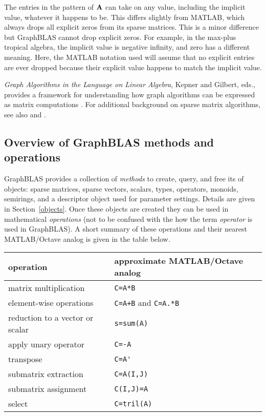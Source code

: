 \documentclass[12pt]{article}
\begin{document}
The entries in the pattern of ${\bf A}$ can take on any value, including the
implicit value, whatever it happens to be.  This differs slightly from MATLAB,
which always drops all explicit zeros from its sparse matrices.  This is a
minor difference but GraphBLAS cannot drop explicit zeros.  For example, in the
max-plus tropical algebra, the implicit value is negative infinity, and zero
has a different meaning.  Here, the MATLAB notation used will assume that no
explicit entries are ever dropped because their explicit value happens to match
the implicit value.

{\em Graph Algorithms in the Language on Linear Algebra}, Kepner and Gilbert,
eds., provides a framework for understanding how graph algorithms can be
expressed as matrix computations \cite{KepnerGilbert2011}.  For additional
background on sparse matrix algorithms, see also \cite{Davis06book} and
\cite{DavisRajamanickamSidLakhdar16}.

\subsection{Overview of GraphBLAS methods and operations} %
\label{overview}

GraphBLAS provides a collection of {\em methods} to create, query, and free its
of objects: sparse matrices, sparse vectors, scalars, types, operators,
monoids, semirings, and a descriptor object used for parameter settings.
Details are given in Section~\ref{objects}.  Once these objects are created
they can be used in mathematical {\em operations} (not to be confused with the
how the term {\em operator} is used in GraphBLAS).  A short summary of these
operations and their nearest MATLAB/Octave analog is given in the table below.

\begin{tabular}{ll}
operation                           & approximate MATLAB/Octave analog \\
\hline
matrix multiplication               & \verb'C=A*B' \\
element-wise operations             & \verb'C=A+B' and \verb'C=A.*B' \\
reduction to a vector or scalar     & \verb's=sum(A)' \\
apply unary operator                & \verb'C=-A' \\
transpose                           & \verb"C=A'" \\
submatrix extraction                & \verb'C=A(I,J)' \\
submatrix assignment                & \verb'C(I,J)=A' \\
select                              & \verb'C=tril(A)' \\
\hline
\end{tabular}
\vspace{0.1in}
\end{document}
